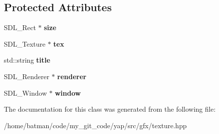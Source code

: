 \subsection*{Protected Attributes}
\begin{DoxyCompactItemize}
\item 
\hypertarget{classTexture_ae939175c09245afc0ab21ad03f0c1d8f}{}S\+D\+L\+\_\+\+Rect $\ast$ {\bfseries size}\label{classTexture_ae939175c09245afc0ab21ad03f0c1d8f}

\item 
\hypertarget{classTexture_aa7452e254b9eef40a4e180f696c712bc}{}S\+D\+L\+\_\+\+Texture $\ast$ {\bfseries tex}\label{classTexture_aa7452e254b9eef40a4e180f696c712bc}

\item 
\hypertarget{classTexture_a0c3be0af7dab3095fe0e6786e83dbd11}{}std\+::string {\bfseries title}\label{classTexture_a0c3be0af7dab3095fe0e6786e83dbd11}

\item 
\hypertarget{classTexture_ad6d227cb6ba9ed5713bfa8b9702e5c20}{}S\+D\+L\+\_\+\+Renderer $\ast$ {\bfseries renderer}\label{classTexture_ad6d227cb6ba9ed5713bfa8b9702e5c20}

\item 
\hypertarget{classTexture_a9c05f0b3afac1695d7c196b9a2103c93}{}S\+D\+L\+\_\+\+Window $\ast$ {\bfseries window}\label{classTexture_a9c05f0b3afac1695d7c196b9a2103c93}

\end{DoxyCompactItemize}


The documentation for this class was generated from the following file\+:\begin{DoxyCompactItemize}
\item 
/home/batman/code/my\+\_\+git\+\_\+code/yap/src/gfx/texture.\+hpp\end{DoxyCompactItemize}
